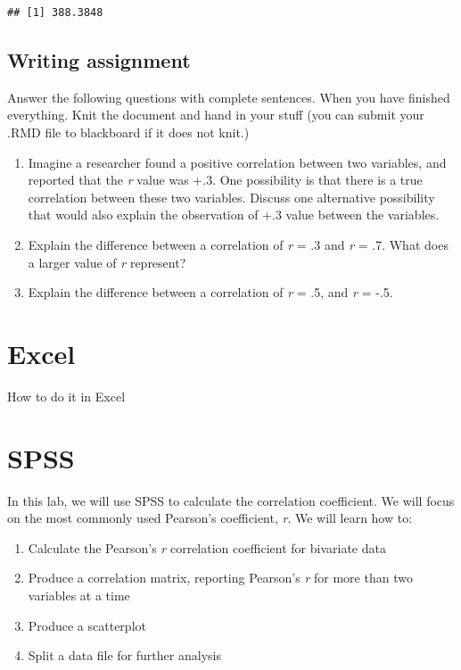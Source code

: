 \documentclass[
]{book}
\providecommand{\tightlist}{%
  \setlength{\itemsep}{0pt}\setlength{\parskip}{0pt}}
\begin{document}
\begin{verbatim}
## [1] 388.3848
\end{verbatim}

\hypertarget{writing-assignment-4}{%
\subsection{Writing assignment}\label{writing-assignment-4}}

Answer the following questions with complete sentences. When you have finished everything. Knit the document and hand in your stuff (you can submit your .RMD file to blackboard if it does not knit.)

\begin{enumerate}
\def\labelenumi{\arabic{enumi}.}
\item
  Imagine a researcher found a positive correlation between two variables, and reported that the \emph{r} value was +.3. One possibility is that there is a true correlation between these two variables. Discuss one alternative possibility that would also explain the observation of +.3 value between the variables.
\item
  Explain the difference between a correlation of \emph{r} = .3 and \emph{r} = .7. What does a larger value of \emph{r} represent?
\item
  Explain the difference between a correlation of \emph{r} = .5, and \emph{r} = -.5.
\end{enumerate}

\hypertarget{excel-6}{%
\section{Excel}\label{excel-6}}

How to do it in Excel

\hypertarget{spss-6}{%
\section{SPSS}\label{spss-6}}

In this lab, we will use SPSS to calculate the correlation coefficient. We will focus on the most commonly used Pearson's coefficient, \emph{r}. We will learn how to:

\begin{enumerate}
\def\labelenumi{\arabic{enumi}.}
\tightlist
\item
  Calculate the Pearson's \emph{r} correlation coefficient for bivariate data
\item
  Produce a correlation matrix, reporting Pearson's \emph{r} for more than two variables at a time
\item
  Produce a scatterplot
\item
  Split a data file for further analysis
\end{enumerate}
\end{document}
